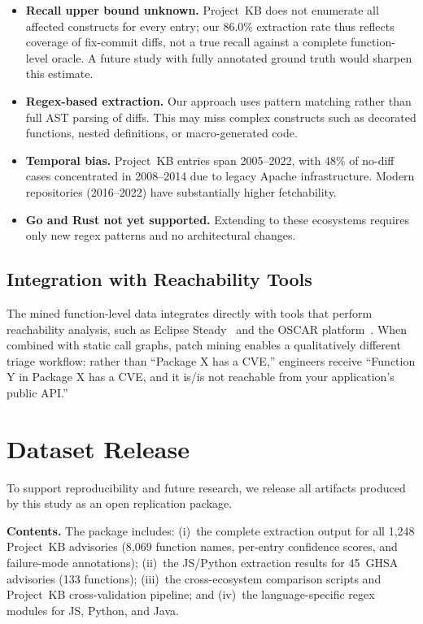 \documentclass[sigconf,nonacm]{acmart}
\begin{document}
\begin{itemize}
    \item \textbf{Recall upper bound unknown.} Project~KB does not
    enumerate all affected constructs for every entry; our 86.0\%
    extraction rate thus reflects coverage of fix-commit diffs, not
    a true recall against a complete function-level oracle.
    A future study with fully annotated ground truth would sharpen
    this estimate.
    \item \textbf{Regex-based extraction.} Our approach uses pattern
    matching rather than full AST parsing of diffs. This may miss
    complex constructs such as decorated functions, nested definitions,
    or macro-generated code.
    \item \textbf{Temporal bias.} Project~KB entries span 2005--2022,
    with 48\% of no-diff cases concentrated in 2008--2014 due to
    legacy Apache infrastructure. Modern repositories (2016--2022)
    have substantially higher fetchability.
    \item \textbf{Go and Rust not yet supported.} Extending to these
    ecosystems requires only new regex patterns and no architectural
    changes.
\end{itemize}

\subsection{Integration with Reachability Tools}

The mined function-level data integrates directly with tools that perform 
reachability analysis, such as Eclipse 
Steady~\cite{plate2015eclipsesteady} and the OSCAR 
platform~\cite{oscar-icsme}. When combined with static call graphs, 
patch mining enables a qualitatively different triage workflow: rather 
than ``Package X has a CVE,'' engineers receive ``Function Y in Package X 
has a CVE, and it is/is not reachable from your application's public API.''

\section{Dataset Release}
\label{sec:dataset}

To support reproducibility and future research, we release all artifacts
produced by this study as an open replication package.

\textbf{Contents.}
The package includes: (i)~the complete extraction output for all 1{,}248
Project~KB advisories (8{,}069 function names, per-entry confidence scores,
and failure-mode annotations); (ii)~the JS/Python extraction results for
45~GHSA advisories (133 functions); (iii)~the cross-ecosystem comparison
scripts and Project~KB cross-validation pipeline; and (iv)~the
language-specific regex modules for JS, Python, and Java.
\end{document}
